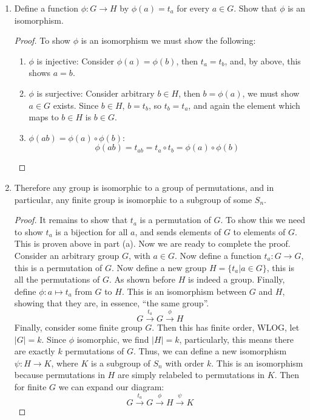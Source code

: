 \documentclass[a4paper,12pt]{extarticle}
\theoremstyle{definition}
\begin{document}
\begin{enumerate}[label=(\alph*)]
\begin{proof}
    \end{proof}
    \item Define a function $\phi:G\to H$ by $\phi(a)=t_a$ for every $a\in G$. Show that $\phi$ is an isomorphism.
        \begin{proof} To show $\phi$ is an isomorphism we must show the following:\begin{enumerate}[label=\roman*.]
            \item $\phi$ is injective: Consider $\phi(a)=\phi(b)$, then $t_a=t_b$, and, by above, this shows $a=b$.
            \item $\phi$ is surjective: Consider arbitrary $b\in H$, then $b=\phi(a)$, we must show $a\in G$ exists. Since $b\in H$, $b=t_b$, so $t_b=t_a$, and again the element which maps to $b\in H$ is $b\in G$.
            \item $\phi(ab)=\phi(a)\circ\phi(b)$: $$\phi(ab)=t_{ab}=t_a\circ t_b=\phi(a)\circ\phi(b)$$
        \end{enumerate}
        \end{proof}
    \item Therefore any group is isomorphic to a group of permutations, and in particular, any finite group is isomorphic to a subgroup of some $S_n$.\begin{proof}
        It remains to show that $t_a$ is a permutation of $G$. To show this we need to show $t_a$ is a bijection for all $a$, and sends elements of $G$ to elements of $G$. This is proven above in part (a). Now we are ready to complete the proof. Consider an arbitrary group $G$, with $a\in G$. Now define a function $t_a:G\to G$, this is a permutation of $G$. Now define a new group $H=\{t_a|a\in G\}$, this is all the permutations of $G$. As shown before $H$ is indeed a group. Finally, define $\phi:a\mapsto t_a$ from $G$ to $H$. This is an isomorphism between $G$ and $H$, showing that they are, in essence, ``the same group''. $$G\overset{t_a}{\longrightarrow}G\overset{\phi}{\longrightarrow}H$$
        Finally, consider some finite group $G$. Then this has finite order, WLOG, let $|G|=k$. Since $\phi$ isomorphic, we find $|H|=k$, particularly, this means there are exactly $k$ permutations of $G$. Thus, we can define a new isomorphism $\psi:H\to K$, where $K$ is a subgroup of $S_n$ with order $k$. This is an isomorphism because permutations in $H$ are simply relabeled to permutations in $K$. Then for finite $G$ we can expand our diagram: $$G\overset{t_a}{\longrightarrow}G\overset{\phi}{\longrightarrow}H\overset{\psi}{\longrightarrow}K$$
    \end{proof}
    \end{enumerate}
\end{document}
